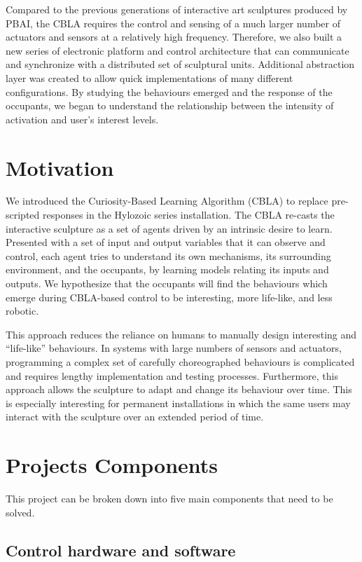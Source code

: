 Compared to the previous generations of interactive art sculptures produced by PBAI, the CBLA requires the control and sensing of a much larger number of actuators and sensors at a relatively high frequency. Therefore, we also built a new series of electronic platform and control architecture that can communicate and synchronize with a distributed set of sculptural units. Additional abstraction layer was created to allow quick implementations of many different configurations. By studying the behaviours emerged and the response of the occupants, we began to understand the relationship between the intensity of activation and user's interest levels. 


\section{Motivation}

We introduced the Curiosity-Based Learning Algorithm (CBLA) to replace pre-scripted responses in the Hylozoic series installation.  The CBLA re-casts the interactive sculpture as a set of agents driven by an intrinsic desire to learn.  Presented with a set of input and output variables that it can observe and control, each agent tries to understand its own mechanisms, its surrounding environment, and the occupants, by learning models relating its inputs and outputs. We hypothesize that the occupants will find the behaviours which emerge during CBLA-based control to be interesting, more life-like, and less robotic. 

This approach reduces the reliance on humans to manually design interesting and “life-like” behaviours. In systems with large numbers of sensors and actuators, programming a complex set of carefully choreographed behaviours is complicated and requires lengthy implementation and testing processes. Furthermore, this approach allows the sculpture to adapt and change its behaviour over time. This is especially interesting for permanent installations in which the same users may interact with the sculpture over an extended period of time. 


\section{Projects Components}

This project can be broken down into five main components that need to be solved.

\subsection{Control hardware and software}

